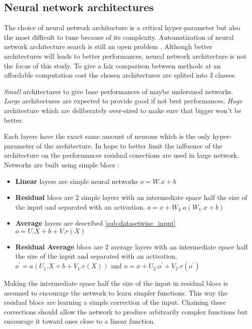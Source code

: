 \subsection{Neural network architectures} %
\label{sub:neural_network_architectures}


The choice of neural network architecture is a critical hyper-parameter but also the most difficult to tune because of its complexity.
Automatization of neural network architecture search is still an open problem \needcite.
Although better architectures will leads to better performances, neural network architecture is not the focus of this study.
To give a fair comparison between methods at an affordable computation cost the chosen architectures are splited into 3 classes.

\emph{Small} architectures to give base performances of maybe undersized networks.
\emph{Large} architectures are expected to provide good if not best performances.
\emph{Huge} architecture which are deliberately over-sized to make sure that bigger won't be better.


Each layers have the exact same amount of neurons which is the only hyper-parameter of the architecture.
In hope to better limit the inlfuence of the architecture on the performances residual conections are used in large network.
Networks are built using simple blocs :
\begin{itemize}
	\item \textbf{Linear} layers are simple neural networks $o = W.x + b$
	\item \textbf{Residual} blocs are 2 simple layers with an intermediate space half the size of the input and separated with an activation. $o = x + W_2 . a(W_1.x + b)$
	\item \textbf{Average} layers are described \autoref{sub:datasetwise_input} $o = U.X+b+V.r(X)$
	\item \textbf{Residual Average} blocs are 2 average layers with an intermediate space half the size of the input and separated with an activation. $o^\prime = a( U_1.X+b+V_1.r(X) )$ and $o = x + U_2.o^\prime + V_2.r(o^\prime) $
\end{itemize}
Making the intermediate space half the size of the input in residual blocs is assumed to encourage the network to learn simpler functions.
This way the residual blocs are learning a simple correction of the input.
Chaining these corrections should allow the network to produce arbitrarily complex functions but encourage it toward ones close to a linear function.

